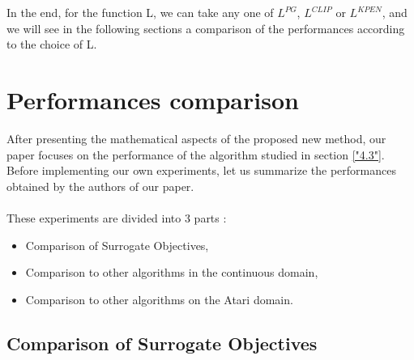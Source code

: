 \documentclass{article}
\begin{document}
\\
\\
In the end, for the function L, we can take any one of $L^{PG}$, $L^{CLIP}$ or $L^{KPEN}$, and we will see in the following sections a comparison of the performances according to the choice of L.

\newpage 

\section{Performances comparison}

After presenting the mathematical aspects of the proposed new method, our paper focuses on the performance of the algorithm studied in section \ref{"4.3"}.
Before implementing our own experiments, let us summarize the performances obtained by the authors of our paper. 
\\ \\
These experiments are divided into 3 parts : 
\begin{itemize}
\item Comparison of Surrogate Objectives,
\item Comparison to other algorithms in the continuous domain,
\item Comparison to other algorithms on the Atari domain.
\end{itemize}

\subsection{Comparison of Surrogate Objectives}
\end{document}
